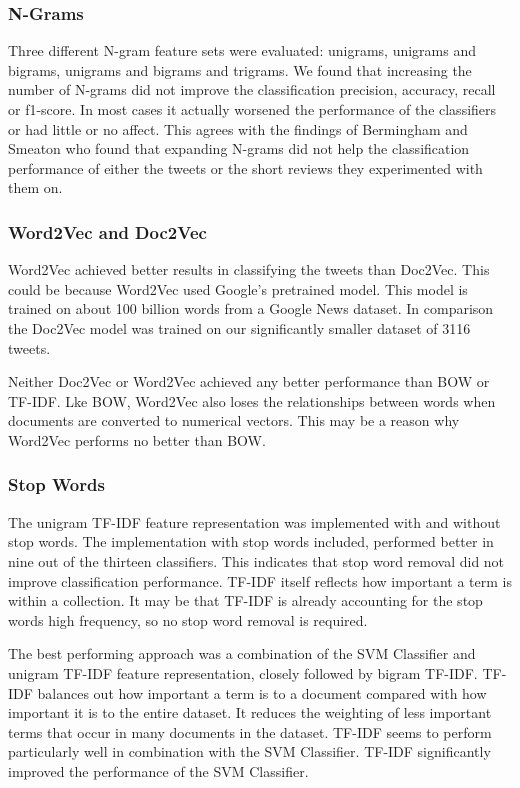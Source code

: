 \subsubsection*{N-Grams}
Three different N-gram feature sets were evaluated: unigrams, unigrams and bigrams, unigrams and bigrams and trigrams. We found that increasing the number of N-grams did not improve the classification precision, accuracy, recall or f1-score. In most cases it actually worsened the performance of the classifiers or had little or no affect. This agrees with the findings of Bermingham and Smeaton \cite{Berm2010} who found that expanding N-grams did not help the classification performance of either the tweets or the short reviews they experimented with them on. 

\subsubsection*{Word2Vec and Doc2Vec}

Word2Vec achieved better results in classifying the tweets than Doc2Vec. This could be because Word2Vec used Google's pretrained model. This model is trained on about 100 billion words from a Google News dataset. In comparison the Doc2Vec model was trained on our significantly smaller dataset of 3116 tweets.

Neither Doc2Vec or Word2Vec achieved any better performance than BOW or TF-IDF. Lke BOW, Word2Vec also loses the relationships between words when documents are converted to numerical vectors. This may be a reason why Word2Vec performs no better than BOW.

\subsubsection*{Stop Words}

The unigram TF-IDF feature representation was implemented with and without stop words. The implementation with stop words included, performed better in nine out of the thirteen classifiers. This indicates that stop word removal did not improve classification performance. TF-IDF itself reflects how important a term is within a collection. It may be that TF-IDF is already accounting for the stop words high frequency, so no stop word removal is required.\newline

The best performing approach was a combination of the SVM Classifier and unigram TF-IDF feature representation, closely followed by bigram TF-IDF. TF-IDF balances out how important a term is to a document compared with how important it is to the entire dataset. It reduces the weighting of less important terms that occur in many documents in the dataset. TF-IDF seems to perform particularly well in combination with the SVM Classifier. TF-IDF significantly improved the performance of the SVM Classifier.

